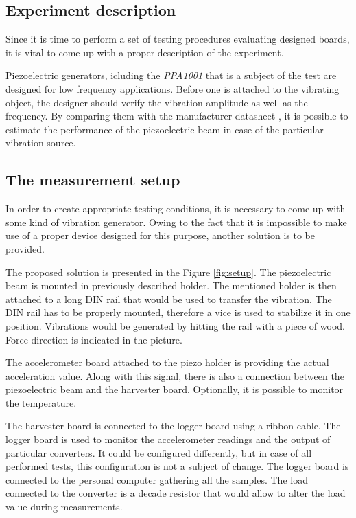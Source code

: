 \documentclass[12pt,a4paper]{article}
\begin{document}
\subsection{Experiment description}

Since it is time to perform a set of testing procedures evaluating designed boards, it is vital to come up with a proper description of the experiment.
\par
Piezoelectric generators, icluding the \textit{PPA1001} that is a subject of the test are designed for low frequency applications. Before one is attached to the vibrating object, the designer should verify the vibration amplitude as well as the frequency. By comparing them with the manufacturer datasheet \cite{PPA}, it is possible to estimate the performance of the piezoelectric beam in case of the particular vibration source. 

\subsection{The measurement setup}
In order to create appropriate testing conditions, it is necessary to come up with some kind of vibration generator. Owing to the fact that it is impossible to make use of a proper device designed for this purpose, another solution is to be provided.
\par
The proposed solution is presented in the Figure \ref{fig:setup}. The piezoelectric beam is mounted in previously described holder. The mentioned holder is then attached to a long DIN rail that would be used to transfer the vibration. The DIN rail has to be properly mounted, therefore a vice is used to stabilize it in one position. Vibrations would be generated by hitting the rail with a piece of wood. Force direction is indicated in the picture.
\par

The accelerometer board attached to the piezo holder is providing the actual acceleration value. Along with this signal, there is also a connection between the piezoelectric beam and the harvester board. Optionally, it is possible to monitor the temperature.
\par

The harvester board is connected to the logger board using a ribbon cable. The logger board is used to monitor the accelerometer readings and the output of particular converters. It could be configured differently, but in case of all performed tests, this configuration is not a subject of change. The logger board is connected to the personal computer gathering all the samples. The load connected to the converter is a decade resistor that would allow to alter the load value during measurements.
\end{document}
